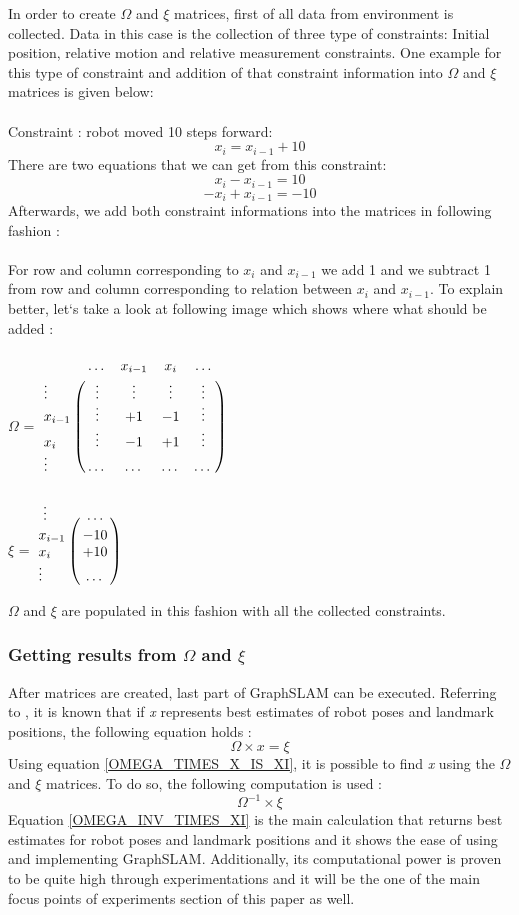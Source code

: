\documentclass{ba-kecs}
\numberwithin{figure}{section}
\numberwithin{equation}{section}
\begin{document}
In order to create $\Omega$ and $\xi$ matrices, first of all data from environment is collected. Data in this case is the collection of three type of constraints: Initial position, relative motion and relative measurement constraints. One example for this type of constraint and addition of that constraint information into $\Omega$ and $\xi$ matrices is given below:\\ \\
	Constraint : robot moved 10 steps forward: 
	\[ x_{i} = x_{i-1} + 10 \]
	There are two equations that we can get from this constraint:
	\[ x_{i} - x_{i-1} = 10 \]
	\[ -x_{i} + x_{i-1} = -10 \]
	Afterwards, we add both constraint informations into the matrices in following fashion :\\ \\
	For row and column corresponding to $x_{i}$ and $x_{i-1}$ we add 1 and we subtract 1 from row and column corresponding to relation between $x_{i}$ and $x_{i-1}$. To explain better, let`s take a look at following image which shows where what should be added :\\ \\
	$\Omega$ = $\bordermatrix{~ & \dots & x_{i-1} & x_{i} & \dots \cr
							\vdots & \vdots & \vdots & \vdots & \vdots \cr
                  			x_{i-1} & \vdots & +1 & -1 & \vdots \cr
                  			x_{i} & \vdots & -1 & +1 & \vdots \cr
                  			\vdots & \dots & \dots & \dots & \dots \cr}$ \\ \\
                  			
    $\xi$ = $\bordermatrix{~ \vdots & \dots \cr
                  			x_{i-1} & -10 \cr
                  			x_{i}  & +10 \cr
                  			\vdots & \dots \cr}$
                  
	$\Omega$ and $\xi$ are populated in this fashion with all the collected constraints.
	
\subsubsection{Getting results from $\Omega$ and $\xi$}
	After matrices are created, last part of GraphSLAM can be executed. Referring to \cite{sik2}, it is known that if \textit{x} represents best estimates of robot poses and landmark positions, the following equation holds :
	\begin{equation}
	\Omega \times x = \xi \label{OMEGA_TIMES_X_IS_XI}
	\end{equation}
	Using equation \eqref{OMEGA_TIMES_X_IS_XI}, it is possible to find \textit{x} using the $\Omega$ and $\xi$ matrices. To do so, the following computation is used :
	\begin{equation}
	\Omega^{-1} \times \xi \label{OMEGA_INV_TIMES_XI}
	\end{equation}
	Equation \eqref{OMEGA_INV_TIMES_XI} is the main calculation that returns best estimates for robot poses and landmark positions and it shows the ease of using and implementing GraphSLAM. Additionally, its computational power is proven to be quite high through experimentations\cite{sik,sik2} and it will be the one of the main focus points of experiments section of this paper as well.
\end{document}
